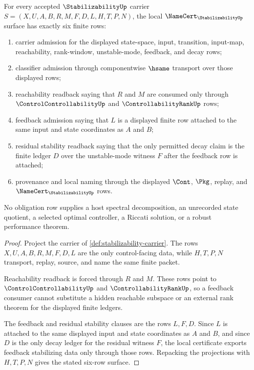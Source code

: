 \begin{theorem}
\label{thm:stabilizability-namecert-obligations}
For every accepted $\StabilizabilityUp$ carrier $S=(X,U,A,B,R,M,F,D,L,H,T,P,N)$, the local $\NameCert_{\StabilizabilityUp}$ surface has exactly six finite rows:
\begin{enumerate}
\item carrier admission for the displayed state-space, input, transition, input-map, reachability, rank-window, unstable-mode, feedback, and decay rows;
\item classifier admission through componentwise $\hsame$ transport over those displayed rows;
\item reachability readback saying that $R$ and $M$ are consumed only through $\ControlControllabilityUp$ and $\ControllabilityRankUp$ rows;
\item feedback admission saying that $L$ is a displayed finite row attached to the same input and state coordinates as $A$ and $B$;
\item residual stability readback saying that the only permitted decay claim is the finite ledger $D$ over the unstable-mode witness $F$ after the feedback row is attached;
\item provenance and local naming through the displayed $\Cont$, $\Pkg$, replay, and $\NameCert_{\StabilizabilityUp}$ rows.
\end{enumerate}
No obligation row supplies a host spectral decomposition, an unrecorded state quotient, a selected optimal controller, a Riccati solution, or a robust performance theorem.
\end{theorem}
\begin{proof}
Project the carrier of \autoref{def:stabilizability-carrier}. The rows $X,U,A,B,R,M,F,D,L$ are the only control-facing data, while $H,T,P,N$ transport, replay, source, and name the same finite packet.

Reachability readback is forced through $R$ and $M$. These rows point to $\ControlControllabilityUp$ and $\ControllabilityRankUp$, so a feedback consumer cannot substitute a hidden reachable subspace or an external rank theorem for the displayed finite ledgers.

The feedback and residual stability clauses are the rows $L,F,D$. Since $L$ is attached to the same displayed input and state coordinates as $A$ and $B$, and since $D$ is the only decay ledger for the residual witness $F$, the local certificate exports feedback stabilizing data only through those rows. Repacking the projections with $H,T,P,N$ gives the stated six-row surface.
\end{proof}

